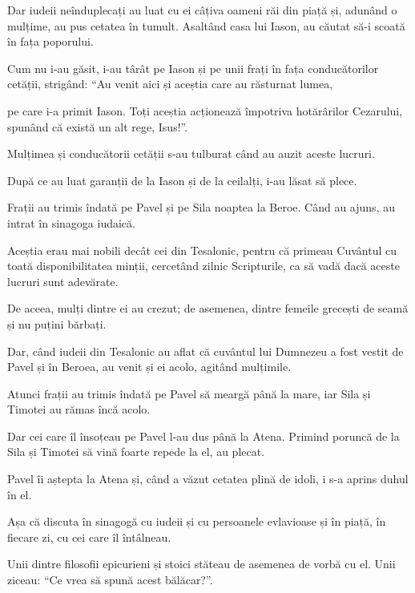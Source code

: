 {Dar iudeii neînduplecați au luat cu ei câțiva oameni răi din piață și, adunând o mulțime, au pus cetatea în tumult. Asaltând casa lui Iason, au căutat să-i scoată în fața poporului.

Cum nu i-au găsit, i-au târât pe Iason și pe unii frați în fața conducătorilor cetății, strigând: “Au venit aici și aceștia care au răsturnat lumea,

pe care i-a primit Iason. Toți aceștia acționează împotriva hotărârilor Cezarului, spunând că există un alt rege, Isus!”.

Mulțimea și conducătorii cetății s-au tulburat când au auzit aceste lucruri.

După ce au luat garanții de la Iason și de la ceilalți, i-au lăsat să plece.


\par }{\PP {}Frații au trimis îndată pe Pavel și pe Sila noaptea la Beroe. Când au ajuns, au intrat în sinagoga iudaică.


\par }{\PP {}Aceștia erau mai nobili decât cei din Tesalonic, pentru că primeau Cuvântul cu toată disponibilitatea minții, cercetând zilnic Scripturile, ca să vadă dacă aceste lucruri sunt adevărate.

De aceea, mulți dintre ei au crezut; de asemenea, dintre femeile grecești de seamă și nu puțini bărbați.

Dar, când iudeii din Tesalonic au aflat că cuvântul lui Dumnezeu a fost vestit de Pavel și în Beroea, au venit și ei acolo, agitând mulțimile.

Atunci frații au trimis îndată pe Pavel să meargă până la mare, iar Sila și Timotei au rămas încă acolo.

Dar cei care îl însoțeau pe Pavel l-au dus până la Atena. Primind poruncă de la Sila și Timotei să vină foarte repede la el, au plecat.


\par }{\PP {}Pavel îi aștepta la Atena și, când a văzut cetatea plină de idoli, i s-a aprins duhul în el.

Așa că discuta în sinagogă cu iudeii și cu persoanele evlavioase și în piață, în fiecare zi, cu cei care îl întâlneau.

Unii dintre filosofii epicurieni și stoici stăteau de asemenea de vorbă cu el. Unii ziceau: “Ce vrea să spună acest bălăcar?”.

}
